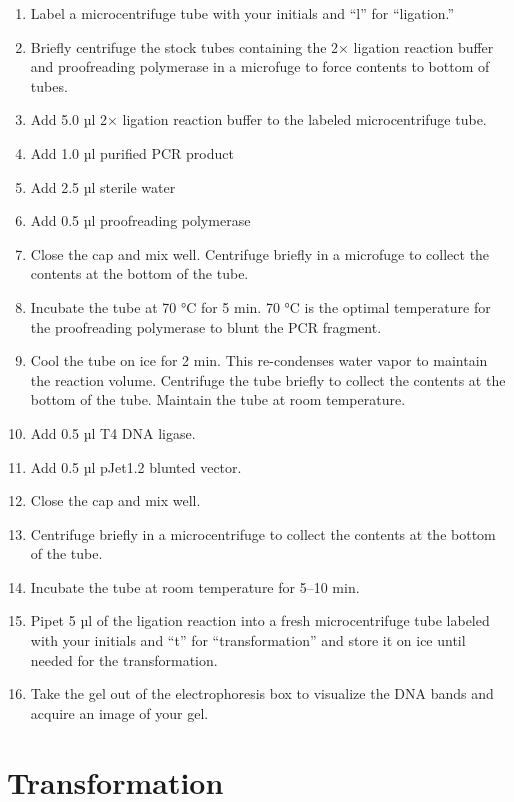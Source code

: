 \documentclass[]{book}
\providecommand{\tightlist}{%
  \setlength{\itemsep}{0pt}\setlength{\parskip}{0pt}}
\theoremstyle{definition}
\theoremstyle{definition}
\theoremstyle{definition}
\theoremstyle{remark}
\begin{document}
\begin{enumerate}
\def\labelenumi{\arabic{enumi}.}
\tightlist
\item
  Label a microcentrifuge tube with your initials and ``l'' for
  ``ligation.''
\item
  Briefly centrifuge the stock tubes containing the 2× ligation reaction
  buffer and proofreading polymerase in a microfuge to force contents to
  bottom of tubes.
\item
  Add 5.0 µl 2× ligation reaction buffer to the labeled microcentrifuge
  tube.
\item
  Add 1.0 µl purified PCR product
\item
  Add 2.5 µl sterile water
\item
  Add 0.5 µl proofreading polymerase
\item
  Close the cap and mix well. Centrifuge briefly in a microfuge to
  collect the contents at the bottom of the tube.
\item
  Incubate the tube at 70 °C for 5 min. 70 °C is the optimal temperature
  for the proofreading polymerase to blunt the PCR fragment.
\item
  Cool the tube on ice for 2 min. This re-condenses water vapor to
  maintain the reaction volume. Centrifuge the tube briefly to collect
  the contents at the bottom of the tube. Maintain the tube at room
  temperature.
\item
  Add 0.5 µl T4 DNA ligase.
\item
  Add 0.5 µl pJet1.2 blunted vector.
\item
  Close the cap and mix well.
\item
  Centrifuge briefly in a microcentrifuge to collect the contents at the
  bottom of the tube.
\item
  Incubate the tube at room temperature for 5--10 min.
\item
  Pipet 5 µl of the ligation reaction into a fresh microcentrifuge tube
  labeled with your initials and ``t'' for ``transformation'' and store
  it on ice until needed for the transformation.
\item
  Take the gel out of the electrophoresis box to visualize the DNA bands
  and acquire an image of your gel.
\end{enumerate}

\section{Transformation}\label{transformation}
\end{document}
